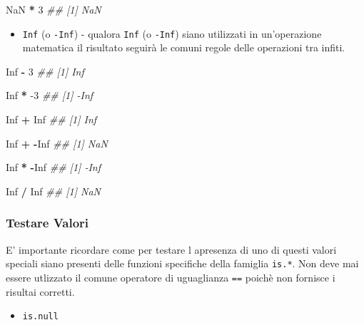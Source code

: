 \documentclass[
]{book}
\newenvironment{Shaded}{\begin{snugshade}}{\end{snugshade}}
\newcommand{\CommentTok}[1]{\textcolor[rgb]{0.56,0.35,0.01}{\textit{#1}}}
\newcommand{\DecValTok}[1]{\textcolor[rgb]{0.00,0.00,0.81}{#1}}
\newcommand{\OperatorTok}[1]{\textcolor[rgb]{0.81,0.36,0.00}{\textbf{#1}}}
\newcommand{\OtherTok}[1]{\textcolor[rgb]{0.56,0.35,0.01}{#1}}
\newcommand{\StringTok}[1]{\textcolor[rgb]{0.31,0.60,0.02}{#1}}
\providecommand{\tightlist}{%
  \setlength{\itemsep}{0pt}\setlength{\parskip}{0pt}}
\begin{document}
\begin{Shaded}
\begin{Highlighting}[]
\OtherTok{NaN} \OperatorTok{*}\StringTok{ }\DecValTok{3}
\CommentTok{## [1] NaN}
\end{Highlighting}
\end{Shaded}

\begin{itemize}
\tightlist
\item
  \texttt{Inf} (o \texttt{-Inf}) - qualora \texttt{Inf} (o \texttt{-Inf}) siano utilizzati in un'operazione matematica il risultato seguirà le comuni regole delle operazioni tra infiti.
\end{itemize}

\begin{Shaded}
\begin{Highlighting}[]
\OtherTok{Inf} \OperatorTok{-}\StringTok{ }\DecValTok{3}
\CommentTok{## [1] Inf}

\OtherTok{Inf} \OperatorTok{*}\StringTok{ }\DecValTok{-3}
\CommentTok{## [1] -Inf}

\OtherTok{Inf} \OperatorTok{+}\StringTok{ }\OtherTok{Inf}
\CommentTok{## [1] Inf}

\OtherTok{Inf} \OperatorTok{+}\StringTok{ }\OperatorTok{-}\OtherTok{Inf}
\CommentTok{## [1] NaN}

\OtherTok{Inf} \OperatorTok{*}\StringTok{ }\OperatorTok{-}\OtherTok{Inf}
\CommentTok{## [1] -Inf}

\OtherTok{Inf} \OperatorTok{/}\StringTok{ }\OtherTok{Inf}
\CommentTok{## [1] NaN}
\end{Highlighting}
\end{Shaded}

\hypertarget{testare-valori}{%
\subsubsection*{Testare Valori}\label{testare-valori}}

E' importante ricordare come per testare l apresenza di uno di questi valori speciali siano presenti delle funzioni specifiche della famiglia \texttt{is.*}. Non deve mai essere utlizzato il comune operatore di uguaglianza \texttt{==} poichè non fornisce i risultai corretti.

\begin{itemize}
\tightlist
\item
  \texttt{is.null}
\end{itemize}
\end{document}
